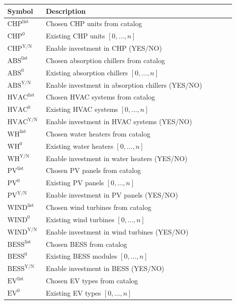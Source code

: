 \documentclass[11pt]{article}
\begin{document}
\begin{center}
\centering
\begin{tabular}{p{0.12\linewidth}p{0.8\linewidth}}
\hline
\textbf{Symbol} & \textbf{Description} \\
\hline
\(\text{CHP}^\text{list}\) & Chosen CHP units from catalog \\
\(\text{CHP}^\text{0}\) & Existing CHP units \([0, \ldots, n]\) \\
\(\text{CHP}^\text{Y/N}\) & Enable investment in CHP (YES/NO) \\
\(\text{ABS}^\text{list}\) & Chosen absorption chillers from catalog \\
\(\text{ABS}^\text{0}\) & Existing absorption chillers \([0, \ldots, n]\) \\
\(\text{ABS}^\text{Y/N}\) & Enable investment in absorption chillers (YES/NO) \\
\(\text{HVAC}^\text{list}\) & Chosen HVAC systems from catalog \\
\(\text{HVAC}^\text{0}\) & Existing HVAC systems \([0, \ldots, n]\) \\
\(\text{HVAC}^\text{Y/N}\) & Enable investment in HVAC systems (YES/NO) \\
\(\text{WH}^\text{list}\) & Chosen water heaters from catalog \\
\(\text{WH}^\text{0}\) & Existing water heaters \([0, \ldots, n]\) \\
\(\text{WH}^\text{Y/N}\) & Enable investment in water heaters (YES/NO) \\
\(\text{PV}^\text{list}\) & Chosen PV panels from catalog \\
\(\text{PV}^\text{0}\) & Existing PV panels \([0, \ldots, n]\) \\
\(\text{PV}^\text{Y/N}\) & Enable investment in PV panels (YES/NO) \\
\(\text{WIND}^\text{list}\) & Chosen wind turbines from catalog \\
\(\text{WIND}^\text{0}\) & Existing wind turbines \([0, \ldots, n]\) \\
\(\text{WIND}^\text{Y/N}\) & Enable investment in wind turbines (YES/NO) \\
\(\text{BESS}^\text{list}\) & Chosen BESS from catalog \\
\(\text{BESS}^\text{0}\) & Existing BESS modules \([0, \ldots, n]\) \\
\(\text{BESS}^\text{Y/N}\) & Enable investment in BESS (YES/NO) \\
\(\text{EV}^\text{list}\) & Chosen EV types from catalog \\
\(\text{EV}^\text{0}\) & Existing EV types \([0, \ldots, n]\) \\
\hline
\end{tabular}
\captionsetup{type=table}
\label{tab:space_domain_parameters}
\end{center}
\end{document}
